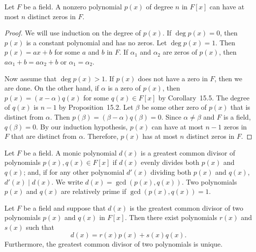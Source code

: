  
\begin{corollary}\label{zeros_poly}
Let $F$ be a field. A nonzero polynomial $p(x)$ of degree $n$ in
$F[x]$ can have at most $n$ distinct zeros in $F$.  
\end{corollary}
 
 
\begin{proof}
We will use induction on the degree of $p(x)$. If $\deg p(x) = 0$,
then $p(x)$ is a constant polynomial and has no zeros.  Let $\deg p(x)
= 1$. Then $p(x) = ax +b$ for some $a$ and $b$ in $F$. If $\alpha_1$ and
$\alpha_2$ are zeros of $p(x)$, then $a\alpha_1 + b = a\alpha_2 +b$ or
$\alpha_1 = \alpha_2$. 
 
Now assume that $\deg p(x) > 1$. If $p(x)$ does not have a zero in
$F$, then we are done.  On the other hand, if $\alpha$ is a zero of
$p(x)$, then $p(x) = (x - \alpha ) q(x)$ for some $q(x) \in F[x]$ by
Corollary~15.5. The degree of $q(x)$ is $n-1$ by Proposition~15.2.
Let $\beta$ be some other zero of $p(x)$ that is distinct from
$\alpha$. Then $p(\beta) = (\beta - \alpha) q(\beta) = 0$. Since
$\alpha \neq \beta$ and $F$ is a field, $q(\beta ) = 0$. By our
induction hypothesis, $p(x)$ can have at most $n -1$ zeros in $F$ that
are distinct from $\alpha$. Therefore, $p(x)$ has at most $n$ distinct
zeros in $F$.
\end{proof}
 
 
\medskip
 
 
Let $F$ be a field.  A monic polynomial $d(x)$ is a {\bfi greatest
common divisor\/} of polynomials 
$p(x), q(x) \in F[x]$ if $d(x)$ evenly divides both $p(x)$ and $q(x)$;
and, if for any other polynomial $d'(x)$ dividing both $p(x)$ and
$q(x)$,  $d'(x) \mid d(x)$.  We write $d(x) = \gcd( p(x), q( x))$. Two
polynomials $p(x)$ and $q(x)$ are {\bfi relatively prime\/} if $\gcd(
p(x), q(x) ) = 1$. 
 
 
\begin{proposition}
Let $F$ be a field and suppose that $d(x)$ is the greatest common
divisor of two polynomials $p(x)$ and $q(x)$ in $F[x]$. Then there
exist polynomials $r(x)$ and $s(x)$ such that
$$
d(x) = r(x) p(x) + s(x) q(x).
$$
Furthermore, the greatest common divisor of two polynomials is unique. 
\end{proposition}
 
